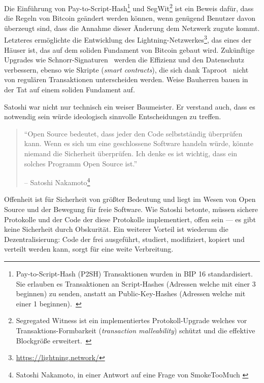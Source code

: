 Die Einführung von Pay-to-Script-Hash\footnote{Pay-to-Script-Hash (P2SH)
Transaktionen wurden in BIP 16 standardisiert. Sie erlauben es Transaktionen an
Script-Hashes (Adressen welche mit einer 3 beginnen) zu senden, anstatt an
Public-Key-Hashes (Adressen welche mit einer 1 beginnen).~\cite{btcwiki:p2sh}}
und SegWit\footnote{Segregated Witness ist ein
implementiertes Protokoll-Upgrade welches vor Transaktions-Formbarkeit
(\textit{transaction malleability}) schützt und die effektive Blockgröße
erweitert.~\cite{btcwiki:segwit}} ist ein Beweis dafür, dass die Regeln von
Bitcoin geändert werden können, wenn genügend Benutzer davon überzeugt sind,
dass die Annahme dieser Änderung dem Netzwerk zugute kommt. Letzteres
ermöglichte die Entwicklung des
Lightning-Netzwerkes\footnote{\url{https://lightning.network/}}, das eines der
Häuser ist, das auf dem soliden Fundament von Bitcoin gebaut wird. Zukünftige
Upgrades wie Schnorr-Signaturen~\cite{bip:schnorr} werden die Effizienz und den
Datenschutz verbessern, ebenso wie Skripte (\textit{smart contracts}), die sich
dank Taproot~\cite{taproot} nicht von regulären Transaktionen unterscheiden
werden. Weise Bauherren bauen in der Tat auf einem soliden Fundament auf.

Satoshi war nicht nur technisch ein weiser Baumeister. Er verstand auch, dass es
notwendig sein würde ideologisch sinnvolle Entscheidungen zu treffen.

\begin{quotation}\begin{samepage}
\enquote{Open Source bedeutet, dass jeder den Code selbstständig überprüfen
kann. Wenn es sich um eine geschlossene Software handeln würde, könnte niemand
die Sicherheit überprüfen. Ich denke es ist wichtig, dass ein solches Programm
Open Source ist.}
\begin{flushright} -- Satoshi Nakamoto\footnote{Satoshi Nakamoto, in einer
Antwort auf eine Frage von SmokeTooMuch \cite{satoshi-open-source}}
\end{flushright}\end{samepage}\end{quotation}

Offenheit ist für Sicherheit von größter Bedeutung und liegt im Wesen von Open
Source und der Bewegung für freie Software. Wie Satoshi betonte, müssen sichere
Protokolle und der Code der diese Protokolle implementiert, offen sein --- es
gibt keine Sicherheit durch Obskurität. Ein weiterer Vorteil ist wiederum die
Dezentralisierung: Code der frei ausgeführt, studiert, modifiziert, kopiert und
verteilt werden kann, sorgt für eine weite Verbreitung.

